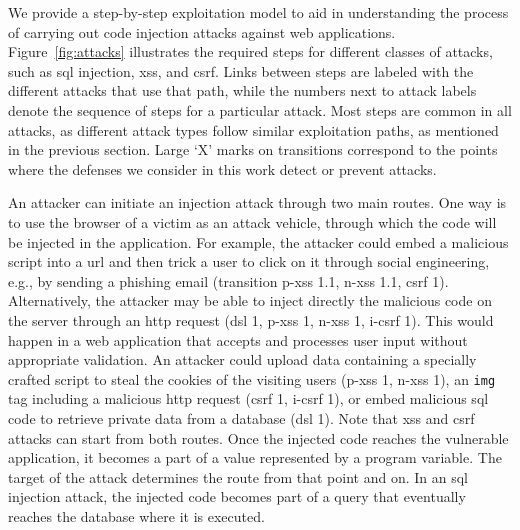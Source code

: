 \documentclass[10pt,journal,compsoc]{IEEEtran}
\begin{document}
We provide a step-by-step exploitation model to aid in understanding the process
of carrying out code injection attacks against web
applications. Figure~\ref{fig:attacks} illustrates the required steps for
different classes of attacks,
such as {\sc sql} injection, {\sc xss}, and {\sc csrf}. Links between steps are
labeled with the different attacks that use that path, while the
numbers next to attack labels denote the sequence of steps for a
particular attack. Most steps are common in all attacks, as different attack
types follow similar exploitation paths, as mentioned in
the previous section. Large `X' marks on transitions correspond to the
points where the defenses we consider in this work detect or prevent attacks.

An attacker can initiate an injection attack through two main routes.
One way is to use the browser of a victim as an attack
vehicle, through which the code will be injected in the application.
For example, the attacker could embed a malicious script into a {\sc
  url} and then trick a user to click on it through social
engineering, e.g., by sending a phishing email (transition {\sc p-xss} 1.1, {\sc
  n-xss} 1.1, {\sc csrf} 1). Alternatively, the attacker may be able
to inject directly the malicious code on the server through an {\sc http} request
({\sc dsl} 1, {\sc p-xss} 1, {\sc n-xss} 1, {\sc i-csrf} 1). This would happen
in a web application that accepts and processes user input
without appropriate validation. An attacker could upload data
containing a specially crafted script
to steal the cookies of the visiting users ({\sc p-xss} 1, {\sc n-xss} 1),
an {\tt img} tag including a malicious {\sc http} request ({\sc csrf 1}, {\sc
i-csrf 1}),
or embed malicious
{\sc sql} code to retrieve private data from a database ({\sc dsl} 1).
Note that {\sc xss} and {\sc csrf} attacks can start from both routes.
Once the injected code reaches the vulnerable application, it becomes
a part of a value represented by a program variable. The target of the
attack determines the route from that point and on. In an {\sc sql} injection
attack, the injected code becomes part of a query that
eventually reaches the database where it is executed.
\end{document}

